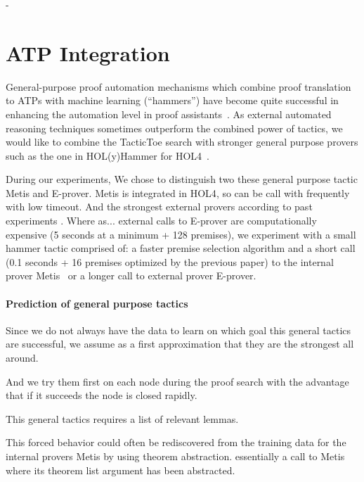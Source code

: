 \documentclass[runningheads,a4paper,draft]{svjour3}
\def\holfour{\textsf{HOL4}\xspace}
\def\eprover{\textsf{E-prover}\xspace}
\def\holyhammer{\textsf{HOL(y)Hammer}\xspace}
\def\metis{\textsf{Metis}\xspace}
\def\tactictoe{\textsf{TacticToe}\xspace}
\begin{document}
%
- 

\section{ATP Integration}
General-purpose proof automation mechanisms which combine proof translation to
ATPs with machine learning (``hammers'') have become quite successful in
enhancing the automation level in proof assistants~\cite{hammers4qed}.
As external automated reasoning techniques sometimes outperform the combined 
power of tactics, we would like to combine the \tactictoe search with 
stronger general purpose provers such as the one in \holyhammer for 
\holfour~\cite{tgck-cpp15}. 

During our experiments,
We chose to distinguish two these general purpose tactic \metis and \eprover.
\metis is integrated in \holfour, so can be call with frequently with low 
timeout.
And the strongest external provers according to past experiments \cite{hh4h4}.
Where as...
external calls to \eprover are computationally expensive (5 seconds at a 
minimum +  128 premises), we  
experiment with a small hammer tactic comprised of: a faster premise 
selection algorithm and
a short call (0.1 seconds + 16 premises optimized by the previous paper) to the 
internal prover \metis~\cite{metis} or a
longer call to external prover \eprover. 



\paragraph{Prediction of general purpose tactics}
Since we do not always have the data to learn on which goal this general 
tactics are successful, we assume as a first approximation that they are the 
strongest all around. 

And we try them first on each node during the proof search with the advantage 
that if it succeeds the node is closed rapidly.

This general tactics requires a list of relevant lemmas.

This forced behavior could often be rediscovered from the training data for the 
internal provers \metis by using theorem abstraction. essentially a call to 
\metis where its 
theorem list argument has been abstracted.
\end{document}
